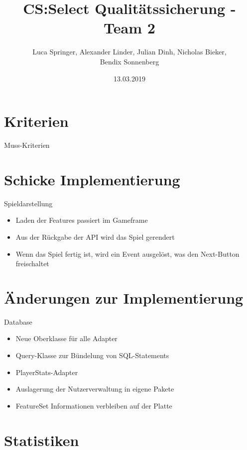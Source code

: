\documentclass[xcolor=dvipsnames]{beamer}
\title[Team 2 - Implementierung]{CS:Select Qualitätssicherung - Team 2}
\author{Luca Springer, Alexander Linder, Julian Dinh, Nicholas Bieker,\\ Bendix Sonnenberg}
\date{13.03.2019}
\begin{document}
    \begin{frame} %
        \titlepage
    \end{frame}

    \section{Kriterien}

    \begin{frame}{Muss-Kriterien}

    \end{frame}

    \section{Schicke Implementierung}
    \begin{frame}{Spieldarstellung}
        \begin{itemize}
            \item Laden der Features passiert im Gameframe
            \item Aus der Rückgabe der API wird das Spiel gerendert
            \item Wenn das Spiel fertig ist, wird ein Event ausgelöst, was den Next-Button freischaltet
        \end{itemize}
    \end{frame}

    \section{Änderungen zur Implementierung}
    \begin{frame}{Database}
        \begin{itemize}
            \item Neue Oberklasse für alle Adapter
            \item Query-Klasse zur Bündelung von SQL-Statements
            \item PlayerStats-Adapter
            \item Auslagerung der Nutzerverwaltung in eigene Pakete
            \item FeatureSet Informationen verbleiben auf der Platte
        \end{itemize}
    \end{frame}

    \renewcommand{\arraystretch}{1.5}

    \section{Statistiken}
\end{document}
